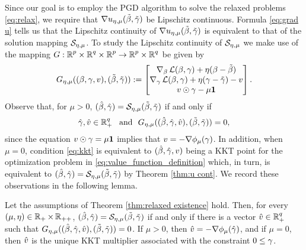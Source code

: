 Since our goal is to employ the PGD algorithm to solve the relaxed problems
\eqref{eq:relax}, we 
require that $\nabla {u_{\eta,\mu}}(\tilde\beta,{\tilde{\gamma}})$ be Lipschitz continuous. 
Formula \eqref{eq:grad u} tells us that the Lipschitz continuity of
$\nabla {u_{\eta,\mu}}(\tilde\beta,{\tilde{\gamma}})$ is equivalent to that of the solution mapping 
$\mathcal{S}_{\eta,\mu}$. 
To study the Lipschitz continuity of $\mathcal{S}_{\eta,\mu}$ we make use of 
the mapping
$G:{\operatorname{\mathbb{R}}^p}\times{\operatorname{\mathbb{R}}^q}\times{\operatorname{\mathbb{R}}^p}\rightarrow {\operatorname{\mathbb{R}}^p}\times{\operatorname{\mathbb{R}}^q}$ 
be given by
\begin{equation}\label{eq:G}
G_{\eta,\mu}((\beta, \gamma,v),(\tilde\beta,{\tilde{\gamma}})):=
\begin{bmatrix}
\nabla_\beta \operatorname{\mathcal{L}}(\beta, \gamma) + \eta(\beta - \tilde\beta) \\
\nabla_\gamma \operatorname{\mathcal{L}}(\beta, \gamma) + 
\eta(\gamma - {\tilde{\gamma}}) - v
\\
v\odot \gamma  -\mu\mathbf{1}
\end{bmatrix}.
\end{equation}
Observe that, for $\mu>0$,  
$(\hat{\beta}, {\hat{\gamma}})=\mathcal{S}_{\eta,\mu}(\tilde\beta,{\tilde{\gamma}})$ 
if and only if 
\begin{equation}\label{eq:kkt}
{\hat{\gamma}},{\hat v}\in\operatorname{\mathbb{R}}_+^q\ \text{ and }\ G_{\eta,\mu}((\hat{\beta}, {\hat{\gamma}},{\hat v}),(\tilde\beta,{\tilde{\gamma}}))=0,
\end{equation} 
since the equation $v\odot \gamma  =\mu\mathbf{1}$ implies that
$v=-\nabla \phi_\mu(\gamma)$. In addition, when $\mu=0$, condition \eqref{eq:kkt}
is equivalent to $(\hat{\beta}, {\hat{\gamma}},v)$ being a KKT point for 
the optimization problem in
\eqref{eq:value_function_definition}
which, in turn, is equivalent to $(\hat{\beta}, {\hat{\gamma}})=\mathcal{S}_{\eta,\mu}(\tilde\beta,{\tilde{\gamma}})$
by Theorem \ref{thm:u cont}. We record these observations in the following lemma.

\begin{lemma}\label{lem:oc for u}
Let the assumptions of Theorem \ref{thm:relaxed existence} hold.
Then, for every $(\mu,\eta)\in\operatorname{\mathbb{R}}_+\times\operatorname{\mathbb{R}}_{++}$, 
$(\hat{\beta}, {\hat{\gamma}})=\mathcal{S}_{\eta,\mu}(\tilde\beta,{\tilde{\gamma}})$ if and only if there is a vector
${\hat v}\in\operatorname{\mathbb{R}}^q_+$ such that $G_{\eta,\mu}((\hat{\beta}, {\hat{\gamma}},{\hat v}),(\tilde\beta,{\tilde{\gamma}}))=0$.
If $\mu>0$, then ${\hat v}=-\nabla \phi_\mu({\hat{\gamma}})$, and if $\mu=0$, then
${\hat v}$ is the unique KKT multiplier associated with the constraint 
$0\le\gamma$.
\end{lemma}

